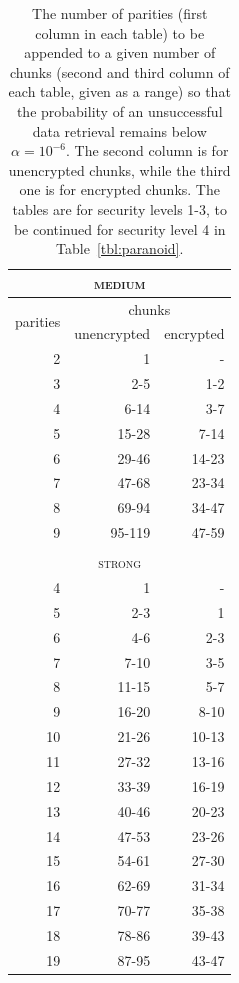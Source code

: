 \documentclass[manuscript,screen,review]{acmart}
\begin{document}
\begin{table}[!ht]
\centering
\caption{The number of parities (first column in each table) to be appended to a given number of chunks (second and third column of each table, given as a range) so that the probability of an unsuccessful data retrieval remains below $\alpha = 10^{-6}$. The second column is for unencrypted  chunks, while the third one is for encrypted chunks. The tables are for security levels 1-3, to be continued for security level 4 in Table~\ref{tbl:paranoid}.}
\begin{minipage}{.49\linewidth}
\begin{tabular}{|r|r|r|}
\multicolumn{3}{c}{\textsc{medium}}\\\hline
\multirow{2}{1.5cm}{\centering 
 parities } 
&\multicolumn{2}{|c|}{ chunks }\\\cline{2-3}
&\multicolumn{1}{|c|}{unencrypted}
&\multicolumn{1}{|c|}{encrypted} \\\hline\hline
2 & 1 & - \\
3 & 2-5     & 1-2\\
4 & 6-14    & 3-7\\ 
5 & 15-28   & 7-14\\ 
6 & 29-46   & 14-23\\  
7 & 47-68   & 23-34\\  
8 & 69-94   & 34-47\\  
9 & 95-119  & 47-59\\   
\hline
%
\multicolumn{3}{c}{\textsc{}}\\
\multicolumn{3}{c}{\textsc{strong}}
\\\hline
4 & 1   &  -\\
5 & 2-3   & 1\\
6 & 4-6   & 2-3\\
7 & 7-10  & 3-5\\
8 & 11-15 & 5-7\\
9 & 16-20 & 8-10\\
10 & 21-26 & 10-13\\
11 & 27-32 & 13-16\\
12 & 33-39 & 16-19\\
13 & 40-46 & 20-23\\
14 & 47-53 & 23-26\\
15 & 54-61 & 27-30\\
16 & 62-69 & 31-34\\
17 & 70-77 & 35-38\\
18 & 78-86 & 39-43\\
19 & 87-95 & 43-47\\

\end{tabular}
\end{minipage}
\end{table}
\end{document}
